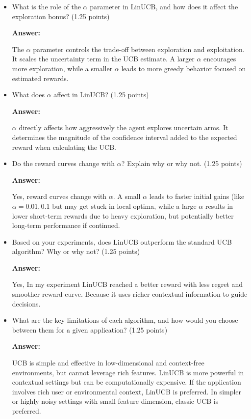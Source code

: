 \documentclass[12pt]{article}
\begin{document}
{{{\begin{itemize}[noitemsep]
\begin{itemize}[noitemsep]
        \item What is the role of the \(\alpha\) parameter in LinUCB, and how does it affect the exploration bonus? (1.25 points)

        \textbf{Answer:}

        The \(\alpha\) parameter controls the trade-off between exploration and exploitation. It scales the uncertainty term in the UCB estimate. A larger \(\alpha\) encourages more exploration, while a smaller \(\alpha\) leads to more greedy behavior focused on estimated rewards.

        \item What does \(\alpha\) affect in LinUCB?  (1.25 points)

        \textbf{Answer:}

        \(\alpha\) directly affects how aggressively the agent explores uncertain arms. It determines the magnitude of the confidence interval added to the expected reward when calculating the UCB.
        
        \item Do the reward curves change with \(\alpha\)? Explain why or why not. (1.25 points)

        \textbf{Answer:}
        
        Yes, reward curves change with \(\alpha\). A small \(\alpha\) leads to faster initial gains (like \(\alpha=0.01, 0.1\) but may get stuck in local optima, while a large \(\alpha\) results in lower short-term rewards due to heavy exploration, but potentially better long-term performance if continued.
        
        \item Based on your experiments, does LinUCB outperform the standard UCB algorithm? Why or why not? (1.25 points)

        \textbf{Answer:}

        Yes, In my experiment LinUCB reached a better reward with less regret and smoother reward curve. Because it uses richer contextual information to guide decisions.

        \item What are the key limitations of each algorithm, and how would you choose between them for a given application? (1.25 points)

        \textbf{Answer:}

        UCB is simple and effective in low-dimensional and context-free environments, but cannot leverage rich features. LinUCB is more powerful in contextual settings but can be computationally expensive. If the application involves rich user or environmental context, LinUCB is preferred. In simpler or highly noisy settings with small feature dimension, classic UCB is preferred.
        

\end{itemize}
\end{itemize}}}}
\end{document}
